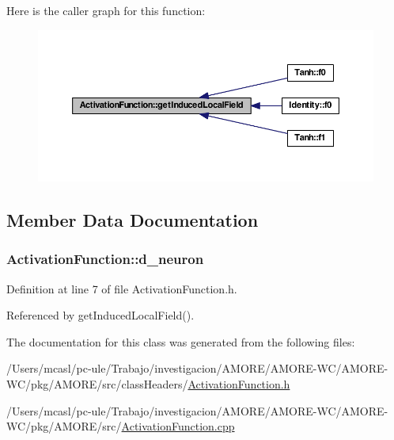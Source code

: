 Here is the caller graph for this function:\nopagebreak
\begin{figure}[H]
\begin{center}
\leavevmode
\includegraphics[width=390pt]{class_activation_function_a72f5e70051e79c0e19318ba1b9bb77ec_icgraph}
\end{center}
\end{figure}




\subsection{Member Data Documentation}
\hypertarget{class_activation_function_ae58cc9df29759bbc76816ebfd68e2084}{
\subsubsection[{d\_\-neuron}]{ {\bf ActivationFunction::d\_\-neuron}}}
\label{class_activation_function_ae58cc9df29759bbc76816ebfd68e2084}


Definition at line 7 of file ActivationFunction.h.



Referenced by getInducedLocalField().



The documentation for this class was generated from the following files:\begin{DoxyCompactItemize}
\item 
/Users/mcasl/pc-\/ule/Trabajo/investigacion/AMORE/AMORE-\/WC/AMORE-\/WC/pkg/AMORE/src/classHeaders/\hyperlink{_activation_function_8h}{ActivationFunction.h}\item 
/Users/mcasl/pc-\/ule/Trabajo/investigacion/AMORE/AMORE-\/WC/AMORE-\/WC/pkg/AMORE/src/\hyperlink{_activation_function_8cpp}{ActivationFunction.cpp}\end{DoxyCompactItemize}
